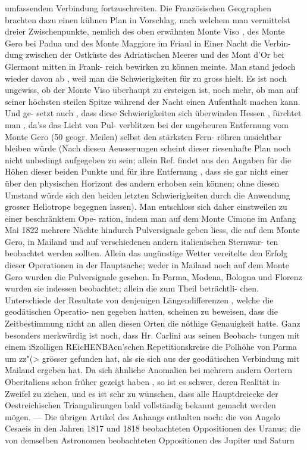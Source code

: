 \documentclass[12pt,a4paper]{article}
\begin{document}
{{{{{{{{umfassendem  Verbindung   fortzuschreiten.     Die  Französischen  Geographen  brachten  dazu  einen  kühnen Plan  in  Vorschlag,  nach  welchem  man  vermittelst  dreier  Zwischenpunkte,  nemlich  des  oben  erwähnten Monte  Viso ,  des  Monte  Gero  bei  Padua  und  des  Monte  Maggiore  im  Friaul  in  Einer  Nacht  die  Verbin- dung zwischen  der  Ostküste  des  Adriatischen  Meeres  und  des  Mont  d'Or  bei  Glermont  mitten  in  Frank- reich bewirken  zu  können  meinte.    Man  stand  jedoch  wieder  davon  ab ,    weil  man  die  Schwierigkeiten für  zu  gross  hielt.     Es  ist  noch  ungewiss,    ob  der  Monte  Viso  überhaupt  zu   ersteigen  ist,    noch  mehr, ob  man  auf  seiner  höchsten  steilen  Spitze  während  der  Nacht  einen  Aufenthalt  machen  kann.     Und  ge- setzt auch ,  dass  diese  Schwierigkeiten  sich  überwinden  Hessen ,  fürchtet  man ,    da'ss   das  Licht  von  Pul- verblitzen bei  der  ungeheuren  Entfernung  vom  Monte  Gero  (50  geogr.  Meilen)  selbst  den  stärksten  Fern- röhren unsichtbar  bleiben  würde     (Nach  diesen  Aeusserungen  scheint  dieser  riesenhafte  Plan  noch  nicht unbedingt  aufgegeben  zu  sein;  allein  Ref.  findet  aus  den  Angaben  für  die  Höhen  dieser  beiden  Punkte und  für  ihre  Entfernung ,  dass  sie  gar  nicht  einer  über  den  physischen  Horizont  des  andern  erhoben  sein können;   ohne  diesen  Umstand  würde   sich    den  beiden  letzten  Schwierigkeiten   durch   die    Anwendung grosser  Heliotrope  begegnen  lassen).    Man  entschloss  sich  daher  einstweilen  zu  einer  beschränktem  Ope- ration, indem  man  auf  dem  Monte  Cimone  im  Anfang  Mai  1822  mehrere  Nächte  hindurch  Pulversignale geben  liess,  die  auf  dem  Monte  Gero,  in  Mailand  und  auf  verschiedenen  andern  italienischen  Sternwar- ten beobachtet  werden  sollten.     Allein  das  ungünstige  Wetter  vereitelte  den  Erfolg  dieser  Operationen in  der  Hauptsache;  weder  in  Mailand  noch  auf  dem  Monte  Gero  wurden  die  Pulversignale  gesehen.    In Parma,  Modena,  Bologna  und  Florenz  wurden  sie  indessen  beobachtet;  allein  die  zum  Theil  beträchtli- chen. Unterschiede  der  Resultate  von  denjenigen  Längendifferenzen ,    welche   die   geodätischen  Operatio- nen gegeben  hatten,  scheinen  zu  beweisen,    dass  die  Zeitbestimmung  nicht   an   allen   diesen  Orten  die nöthige  Genauigkeit  hatte.     Ganz  besonders  merkwürdig  ist  noch,  dass  Hr.  Carlini  aus  seinen  Beobach- tungen mit  einem  iSzolligen  REicHENBAcn'schen  Repetitionskreise  die  Polhöhe  von  Parma  um  zz"(>  grösser gefunden  hat,  als  sie  sich  aus  der  geodätischen  Verbindung  mit  Mailand  ergeben  hat.     Da  sich  ähnliche Anomalien  bei  mehrern  andern  Oertern  Oberitaliens  schon  früher  gezeigt  haben ,  so  ist  es  schwer,  deren Realität  in  Zweifel  zu  ziehen,  und  es  ist  sehr  zu  wünschen,  dass  alle  Hauptdreiecke  der  Oestreichischen Triangulirungen  bald  vollständig  bekannt  gemacht  werden  mögen.  ---     Die  übrigen  Artikel  des  Anhangs enthalten  noch:    die   von  Angelo  Cesaeis   in  den  Jahren    1817   und   1818  beobachteten  Oppositionen  des Uranus;  die  von  demselben  Astronomen  beobachteten  Oppositionen  des  Jupiter  und  Saturn }}}}}}}}
\end{document}
